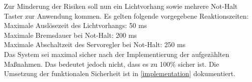 \documentclass[../../../Bachelorarbeit.tex]{subfiles}
\begin{document}
Zur Minderung der Risiken soll nun ein Lichtvorhang sowie mehrere Not-Halt Taster zur Anwendung kommen. Es gelten folgende vorgegebene Reaktionszeiten:\\
\bigskip \newline
Maximale Auslösezeit des Lichtvorhangs: 50 \si{ms}\\
Maximale Bremsdauer bei Not-Halt: 200 \si{ms}\\
Maximale Abschaltzeit des Servoregler bei Not-Halt: 250 \si{ms}\\

Das System sei maximal sicher nach der Implementierung der aufgezählten Maßnahmen. Das bedeutet jedoch nicht, dass es zu 100\% sicher ist. Die Umsetzung der funktionalen Sicherheit ist in \autoref{implementation} dokumentiert.
\end{document}
